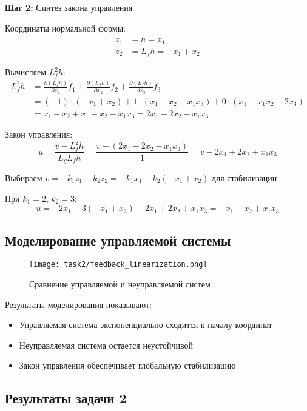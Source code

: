 \textbf{Шаг 2:} Синтез закона управления

Координаты нормальной формы:
\begin{align}
z_1 &= h = x_1 \\
z_2 &= L_f h = -x_1 + x_2
\end{align}

Вычисляем $L_f^2 h$:
\begin{align}
L_f^2 h &= \frac{\partial (L_f h)}{\partial x_1} f_1 + \frac{\partial (L_f h)}{\partial x_2} f_2 + \frac{\partial (L_f h)}{\partial x_3} f_3 \\
&= (-1) \cdot (-x_1 + x_2) + 1 \cdot (x_1 - x_2 - x_1 x_3) + 0 \cdot (x_1 + x_1 x_2 - 2x_3) \\
&= x_1 - x_2 + x_1 - x_2 - x_1 x_3 = 2x_1 - 2x_2 - x_1 x_3
\end{align}

Закон управления:
\begin{equation}
u = \frac{v - L_f^2 h}{L_g L_f h} = \frac{v - (2x_1 - 2x_2 - x_1 x_3)}{1} = v - 2x_1 + 2x_2 + x_1 x_3
\end{equation}

Выбираем $v = -k_1 z_1 - k_2 z_2 = -k_1 x_1 - k_2 (-x_1 + x_2)$ для стабилизации.

При $k_1 = 2$, $k_2 = 3$:
\begin{equation}
u = -2x_1 - 3(-x_1 + x_2) - 2x_1 + 2x_2 + x_1 x_3 = -x_1 - x_2 + x_1 x_3
\end{equation}

\subsection*{Моделирование управляемой системы}

\begin{figure}[H]
\centering
\texttt{[image: task2/feedback\_linearization.png]}
\caption{Сравнение управляемой и неуправляемой систем}
\label{fig:feedback_linearization}
\end{figure}

Результаты моделирования показывают:
\begin{itemize}
\item Управляемая система экспоненциально сходится к началу координат
\item Неуправляемая система остается неустойчивой
\item Закон управления обеспечивает глобальную стабилизацию
\end{itemize}

\subsection*{Результаты задачи 2}

